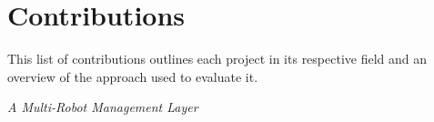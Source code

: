 




\section{Contributions}



This list of contributions outlines each project in its respective field and an overview of the approach used to evaluate it.

\textbf{}



\textit{A Multi-Robot Management Layer}


